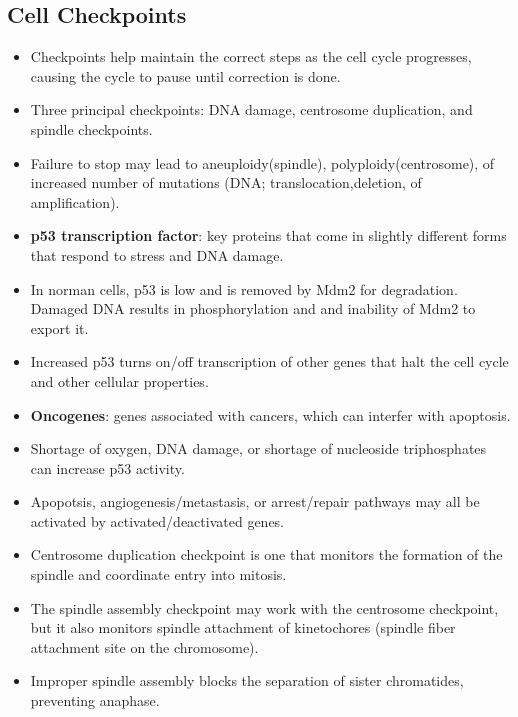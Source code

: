 \documentclass[12pt,a4paper]{article}
\begin{document}
\subsection{Cell Checkpoints}
\begin{itemize}
    \item Checkpoints help maintain the correct steps as the cell cycle progresses, causing the cycle to pause until correction is done.
    \item Three principal checkpoints: DNA damage, centrosome duplication, and spindle checkpoints.
    \item Failure to stop may lead to aneuploidy(spindle), polyploidy(centrosome), of increased number of mutations (DNA; translocation,deletion, of amplification).
    \item \textbf{p53 transcription factor}: key proteins that come in slightly different forms that respond to stress and DNA damage.
    \item In norman cells, p53 is low and is removed by Mdm2 for degradation. Damaged DNA results in phosphorylation and and inability of Mdm2 to export it. 
    \item Increased p53 turns on/off transcription of other genes that halt the cell cycle and other cellular properties.
    \item \textbf{Oncogenes}: genes associated with cancers, which can interfer with apoptosis.
    \item Shortage of oxygen, DNA damage, or shortage of nucleoside triphosphates can increase p53 activity.
    \item Apopotsis, angiogenesis/metastasis, or arrest/repair pathways may all be activated by activated/deactivated genes.
    \item Centrosome duplication checkpoint is one that monitors the formation of the spindle and coordinate entry into mitosis.
    \item The spindle assembly checkpoint may work with the centrosome checkpoint, but it also monitors spindle attachment of kinetochores (spindle fiber attachment site on the chromosome). 
    \item Improper spindle assembly blocks the separation of sister chromatides, preventing anaphase.
\end{itemize}
\end{document}
